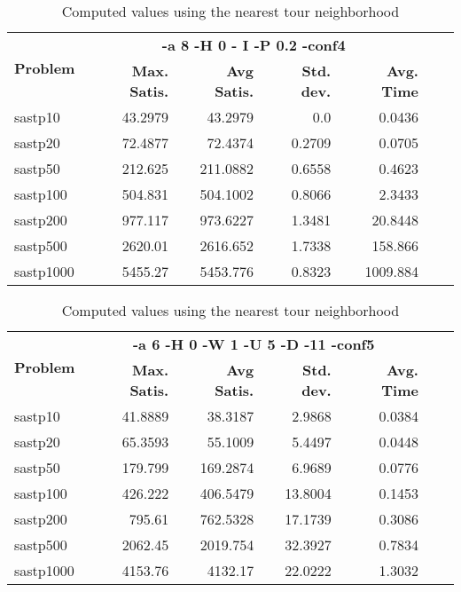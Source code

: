 \documentclass{article}
\begin{document}
\begin{table}[b!]
  \vspace{-6mm}%
  \caption{Computed values using the nearest tour neighborhood}
  \label{tab:NearestTour}
  \setlength{\tabcolsep}{1.4mm}
  \centering
  \begin{tabular}{lrrrrrr}
   \multirow{2}{*}{\bfseries Problem} &
      \multicolumn{4}{c}{\bfseries -a 8 -H 0 - I -P 0.2 -conf4 } \\
    &
    \bfseries Max. Satis. &
    \bfseries Avg Satis. &
    \bfseries Std. dev. &
    \bfseries Avg. Time 
    \\\hline
sastp10 & 43.2979 & 43.2979 & 0.0 & 0.0436 \\ 
sastp20 & 72.4877 & 72.4374 & 0.2709 & 0.0705 \\ 
sastp50 & 212.625 & 211.0882 & 0.6558 & 0.4623 \\ 
sastp100 & 504.831 & 504.1002 & 0.8066 & 2.3433 \\ 
sastp200 & 977.117 & 973.6227 & 1.3481 & 20.8448 \\ 
sastp500 & 2620.01 & 2616.652 & 1.7338 & 158.866 \\ 
sastp1000 & 5455.27 & 5453.776 & 0.8323 & 1009.884

    \\\hline
  \end{tabular}

\end{table}


\begin{table}[b!]
  \vspace{-6mm}%
  \caption{Computed values using the nearest tour neighborhood}
  \label{tab:NearestTour}
  \setlength{\tabcolsep}{1.4mm}
  \centering
  \begin{tabular}{lrrrrrr}
   \multirow{2}{*}{\bfseries Problem} &
      \multicolumn{4}{c}{\bfseries -a 6 -H 0 -W 1 -U 5 -D -11 -conf5 } \\
    &
    \bfseries Max. Satis. &
    \bfseries Avg Satis. &
    \bfseries Std. dev. &
    \bfseries Avg. Time 
    \\\hline
   sastp10 & 41.8889 & 38.3187 & 2.9868 & 0.0384 \\ 
sastp20 & 65.3593 & 55.1009 & 5.4497 & 0.0448 \\ 
sastp50 & 179.799 & 169.2874 & 6.9689 & 0.0776 \\ 
sastp100 & 426.222 & 406.5479 & 13.8004 & 0.1453 \\ 
sastp200 & 795.61 & 762.5328 & 17.1739 & 0.3086 \\ 
sastp500 & 2062.45 & 2019.754 & 32.3927 & 0.7834 \\ 
sastp1000 & 4153.76 & 4132.17 & 22.0222 & 1.3032
    \\\hline
  \end{tabular}

\end{table}
\end{document}
